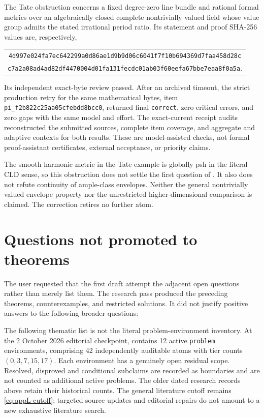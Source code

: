 The Tate obstruction concerns a fixed degree-zero line bundle and rational
formal metrics over an algebraically closed complete nontrivially valued
field whose value group admits the stated irrational period ratio.  Its
statement and proof SHA-256 values are, respectively,
\begin{center}
\small
\begin{tabular}{@{}c@{}}
\nolinkurl{4d997e024fa7ec642299a0d86ae1d9b9d06c6041f7f10b694369d7faa458d28c}\\
\nolinkurl{c7a2a08ad4ad82df4470004d01fa131fecdc01ab03f60eefa67bbe7eaa8f0a5a}.
\end{tabular}
\end{center}
Its independent exact-byte review passed.  After an archived timeout, the
strict production retry for the same mathematical bytes, item
\nolinkurl{pi_f2b822c25aa05cfebdd8bcc0}, returned final
\texttt{correct}, zero critical errors, and zero gaps with the same
model and effort.  The exact-current receipt audits reconstructed the
submitted sources, complete item coverage, and aggregate and adaptive
contexts for both results.  These are model-assisted checks, not formal
proof-assistant certificates, external acceptance, or priority claims.

The smooth harmonic metric in the Tate example is globally psh in the
literal CLD sense, so this obstruction does not settle the first question
of \cite[Remark~17.8.10]{CLD25}.  It also does not refute continuity of
ample-class envelopes.  Neither the general nontrivially valued
envelope property nor the unrestricted higher-dimensional comparison is
claimed.  The correction retires no further atom.

\section{Questions not promoted to theorems}
\label{sec:appL-open}

The user requested that the first draft attempt the adjacent open questions
rather than merely list them.  The research pass produced the preceding
theorems, counterexamples, and restricted solutions.  It did not justify
positive answers to the following broader questions:

The following thematic list is not the literal problem-environment inventory.
At the 2 October 2026 editorial checkpoint, 
contains 12 active \texttt{problem} environments, comprising 42
independently auditable atoms with tier counts \((0,3,7,15,17)\). Each
environment has a genuinely open residual scope. Resolved, disproved and
conditional subclaims are recorded as boundaries and are not counted as
additional active problems. The older dated research records above retain
their historical counts. The general literature cutoff remains
\eqref{eq:appL-cutoff}; targeted source updates and editorial repairs do
not amount to a new exhaustive literature search.

